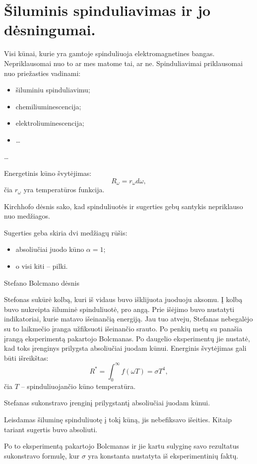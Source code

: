 \chapter{Šiluminis spinduliavimas ir jo dėsningumai.}



Visi kūnai, kurie yra gamtoje spinduliuoja elektromagnetines bangas.
Nepriklausomai nuo to ar mes matome tai, ar ne. Spinduliavimai
priklausomai nuo priežasties vadinami:
\begin{itemize}
  \item šiluminiu spinduliavimu;
  \item chemiliuminescencija;
  \item elektroliuminescencija;
  \item …
\end{itemize}

…

Energetinis kūno švytėjimas:
\begin{equation*}
  R_{\omega} = r_{\omega} d \omega,
\end{equation*}
čia $r_{\omega}$ yra temperatūros funkcija.

Kirchhofo dėsnis sako, kad spinduliuotės ir sugerties gebų santykis
nepriklauso nuo medžiagos.

Sugerties geba skiria dvi medžiagų rūšis:
\begin{itemize}
  \item absoliučiai juodo kūno $\alpha = 1$;
  \item o visi kiti – pilki.
\end{itemize}

Stefano Bolcmano dėsnis

Stefonas sukūrė kolbą, kuri iš vidaus buvo išklijuota juoduoju aksomu.
Į kolbą buvo nukreipta šiluminė spinduliuotė, pro angą. Prie išėjimo
buvo nustatyti indikatoriai, kurie matavo išeinančią energiją.
Jau tuo atveju, Stefanas nebegalėjo su to laikmečio įranga
užfiksuoti išeinančio srauto. Po penkių metų su panašia įrangą
eksperimentą pakartojo Bolcmanas. Po daugelio eksperimentų jie
nustatė, kad toks įrenginys prilygsta absoliučiai juodam kūnui.
Energinis švytėjimas gali būti išreikštas:
\begin{equation*}
  R^{*} = \int _{0} ^{\infty} f (\omega T) = \sigma T^{4},
\end{equation*}
čia $T$ – spinduliuojančio kūno temperatūra.

\begin{remember}
  \item Stefanas sukonstravo įrenginį prilygstantį absoliučiai juodam
    kūnui.
  \item Leisdamas šiluminę spinduliuotę į tokį kūną, jis nebefiksavo
    išeities. Kitaip tariant sugertis buvo absoliuti.
  \item Po to eksperimentą pakartojo Bolcmanas ir jie kartu sulyginę
    savo rezultatus sukonstravo formulę, kur $\sigma$ yra konstanta
    nustatyta iš eksperimentinių faktų.
\end{remember}


